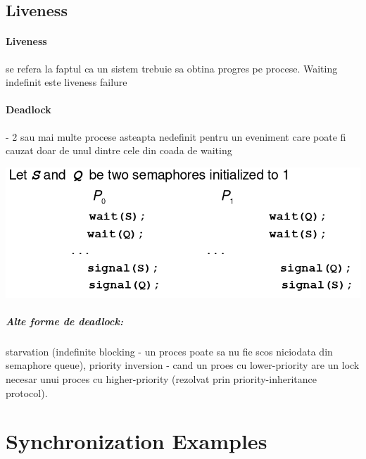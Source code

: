 \documentclass{article}
\begin{document}
\subsection*{Liveness}
\paragraph*{Liveness} se refera la faptul ca un sistem trebuie sa obtina progres pe procese. Waiting indefinit este liveness failure
\paragraph*{Deadlock} - 2 sau mai multe procese asteapta nedefinit pentru un eveniment care poate fi cauzat doar de unul dintre cele din coada de waiting

\begin{center}
    \includegraphics[scale=0.4]{16_deadlock.png}
\end{center}

\subparagraph*{Alte forme de deadlock:} starvation (indefinite blocking - un proces poate sa nu fie scos niciodata din semaphore queue), priority inversion - cand un proes cu lower-priority are un lock necesar unui proces cu higher-priority (rezolvat prin priority-inheritance protocol).


\section[Ch7 Synchronization Examples]{Synchronization Examples}
\end{document}
